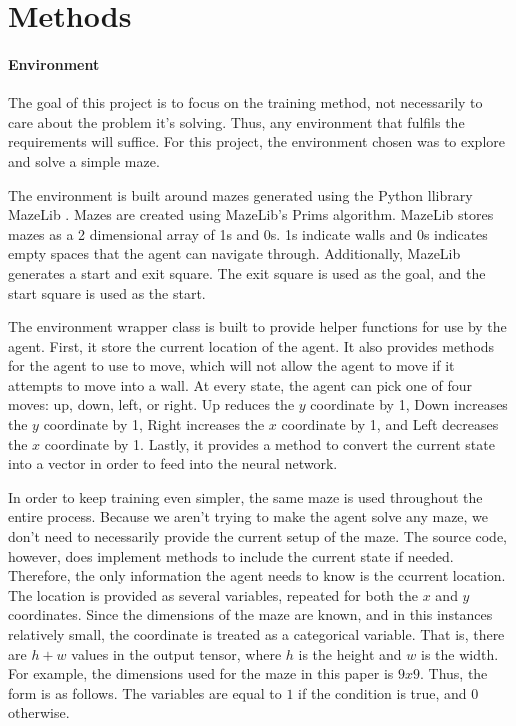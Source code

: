 \documentclass[12pt,letterpaper]{article}
\begin{document}
\section{Methods}

\paragraph{Environment}

The goal of this project is to focus on the training method, not necessarily to care about the problem it's solving.
Thus, any environment that fulfils the requirements will suffice.
For this project, the environment chosen was to explore and solve a simple maze.

The environment is built around mazes generated using the Python \cite{lang_python} llibrary MazeLib \cite{lib_mazelib}.
Mazes are created using MazeLib's Prims algorithm.
MazeLib stores mazes as a 2 dimensional array of 1s and 0s.
1s indicate walls and 0s indicates empty spaces that the agent can navigate through.
Additionally, MazeLib generates a start and exit square.
The exit square is used as the goal, and the start square is used as the start.

The environment wrapper class is built to provide helper functions for use by the agent.
First, it store the current location of the agent.
It also provides methods for the agent to use to move, which will not allow the agent to move if it attempts to move into a wall.
At every state, the agent can pick one of four moves: up, down, left, or right.
Up reduces the $y$ coordinate by 1, Down increases the $y$ coordinate by 1, Right increases the $x$ coordinate by 1, and Left decreases the $x$ coordinate by 1.
Lastly, it provides a method to convert the current state into a vector in order to feed into the neural network.

In order to keep training even simpler, the same maze is used throughout the entire process.
Because we aren't trying to make the agent solve any maze, we don't need to necessarily provide the current setup of the maze.
The source code, however, does implement methods to include the current state if needed.
Therefore, the only information the agent needs to know is the ccurrent location.
The location is provided as several variables, repeated for both the $x$ and $y$ coordinates.
Since the dimensions of the maze are known, and in this instances relatively small, the coordinate is treated as a categorical variable.
That is, there are $h + w$ values in the output tensor, where $h$ is the height and $w$ is the width.
For example, the dimensions used for the maze in this paper is $9x9$.
Thus, the form is as follows. The variables are equal to $1$ if the condition is true, and $0$ otherwise.
\end{document}
